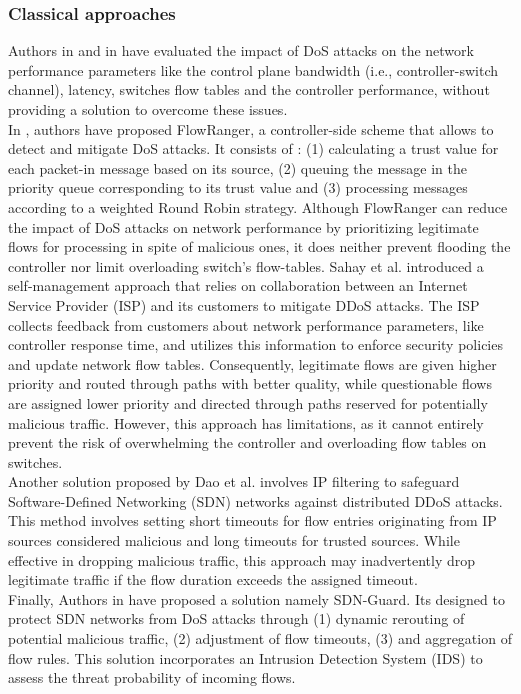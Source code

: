 \subsubsection{Classical approaches}
Authors in \cite{ali1} and in \cite{ali2} have evaluated the impact of DoS attacks on the network performance parameters like the control plane bandwidth (i.e., controller-switch channel), latency, switches flow tables and the controller performance, without providing a solution to overcome these issues. \\
In \cite{ali3}, authors have proposed FlowRanger, a controller-side scheme that allows to detect and mitigate DoS attacks. It consists of : (1) calculating a trust value for each packet-in message based on its source, (2) queuing the message in the priority queue corresponding to its trust value and (3) processing messages according to a weighted Round Robin strategy. Although FlowRanger can reduce the impact of DoS attacks on network performance by prioritizing legitimate flows for processing in spite of malicious ones, it does neither prevent flooding the controller nor limit overloading switch’s flow-tables. 
Sahay et al. \cite{ali4} introduced a self-management approach that relies on collaboration between an Internet Service Provider (ISP) and its customers to mitigate DDoS attacks. The ISP collects feedback from customers about network performance parameters, like controller response time, and utilizes this information to enforce security policies and update network flow tables. Consequently, legitimate flows are given higher priority and routed through paths with better quality, while questionable flows are assigned lower priority and directed through paths reserved for potentially malicious traffic. However, this approach has limitations, as it cannot entirely prevent the risk of overwhelming the controller and overloading flow tables on switches.\\
Another solution proposed by Dao et al. \cite{ali5} involves IP filtering to safeguard Software-Defined Networking (SDN) networks against distributed DDoS attacks. This method involves setting short timeouts for flow entries originating from IP sources considered malicious and long timeouts for trusted sources. While effective in dropping malicious traffic, this approach may inadvertently drop legitimate traffic if the flow duration exceeds the assigned timeout.\\
Finally, Authors in \cite{ali6} have proposed a solution namely SDN-Guard. Its designed to protect SDN networks from DoS attacks through (1) dynamic rerouting of potential malicious traffic, (2) adjustment of flow timeouts, (3) and aggregation of flow rules. This solution incorporates an Intrusion Detection System (IDS) to assess the threat probability of incoming flows. %



